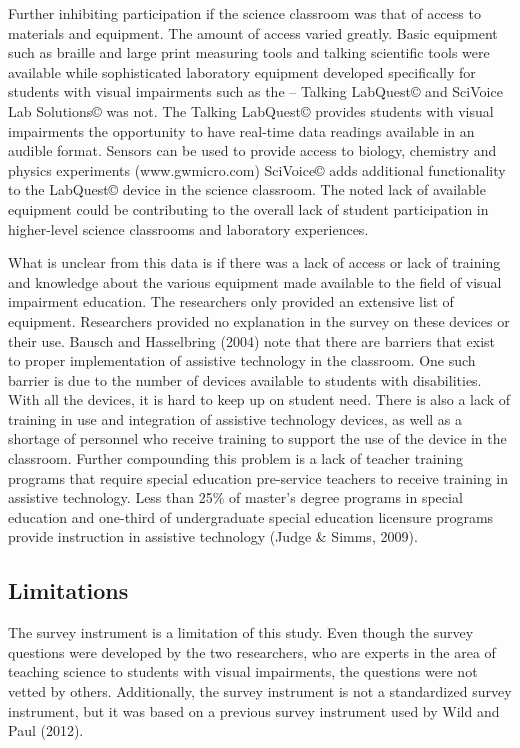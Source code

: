 \documentclass[11.5pt]{sig-alternate} %
\begin{document}
\begin{large}
Further inhibiting participation if the science classroom was that of access to materials and equipment.  The amount of access varied greatly. Basic equipment such as braille and large print measuring tools and talking scientific tools were available while sophisticated laboratory equipment developed specifically for students with visual impairments such as the – Talking Lab\-Quest© and SciVoice Lab Solutions© was not.  The Talking LabQuest© provides students with visual impairments the opportunity to have real-time data readings available in an audible format. Sensors can be used to provide access to biology, chemistry and physics experiments (www.gwmicro.com) SciVoice© adds additional functionality to the LabQuest© device in the science classroom.  The noted lack of available equipment could be contributing to the overall lack of student participation in higher-level science classrooms and laboratory experiences.  
 
What is unclear from this data is if there was a lack of access or lack of training and knowledge about the various equipment made available to the field of visual impairment education.  The researchers only provided an extensive list of equipment.  Researchers provided no explanation in the survey on these devices or their use.  Bausch and Hasselbring (2004) note that there are barriers that exist to proper implementation of assistive technology in the classroom.  One such barrier is due to the number of devices available to students with disabilities.  With all the devices, it is hard to keep up on student need.  There is also a lack of training in use and integration of assistive technology devices, as well as a shortage of personnel who receive training to support the use of the device in the classroom.  Further compounding this problem is a lack of teacher training programs that require special education pre-service teachers to receive training in assistive technology.  Less than 25\% of master’s degree programs in special education and one-third of undergraduate special education licensure programs provide instruction in assistive technology (Judge \& Simms, 2009).

\subsection*{Limitations}

The survey instrument is a limitation of this study.  Even though the survey questions were developed by the two researchers, who are experts in the area of teaching science to students with visual impairments, the questions were not vetted by others. Additionally, the survey instrument is not a standardized survey instrument, but it was based on a previous survey instrument used by Wild and Paul (2012).  


\end{large}
\end{document}
